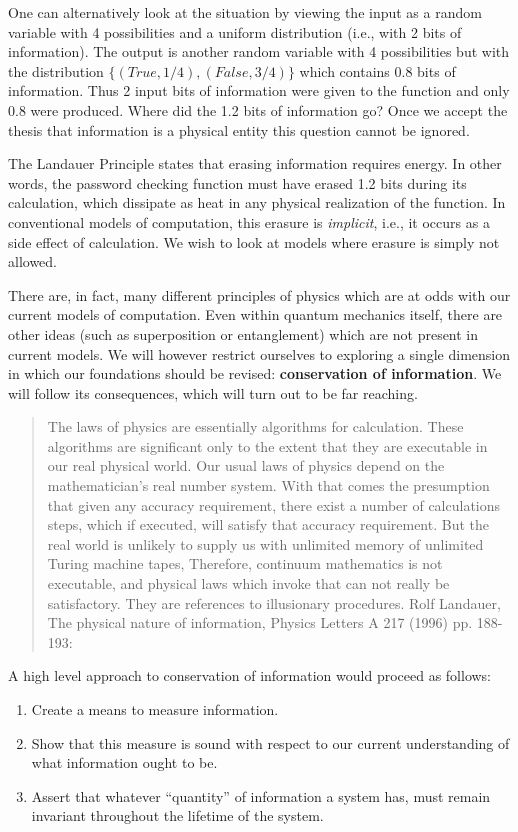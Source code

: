 \documentclass{article}
\begin{document}
One can alternatively look at the situation by viewing the input as a
random variable with 4 possibilities and a uniform distribution (i.e.,
with 2 bits of information). The output is another random variable
with 4 possibilities but with the distribution
$\{ (True, 1/4), (False, 3/4) \}$ which contains 0.8 bits of
information. Thus 2 input bits of information were given to the
function and only 0.8 were produced. Where did the 1.2 bits of
information go? Once we accept the thesis that information is a
physical entity this question cannot be ignored.

The Landauer Principle states that erasing information requires
energy. In other words, the password checking function must have
erased 1.2 bits during its calculation, which dissipate as heat in any
physical realization of the function. In conventional models of
computation, this erasure is \emph{implicit}, i.e., it occurs as a
side effect of calculation. We wish to look at models where
erasure is simply not allowed.

There are, in fact, many different principles of physics which are
at odds with our current models of computation. Even within quantum
mechanics itself, there are other ideas (such as superposition or
entanglement) which are not present in current models. We will however
restrict ourselves to exploring a single dimension in which our
foundations should be revised: \textbf{conservation of information}.
We will follow its consequences, which will turn out to be far reaching.

\begin{quote}
  The laws of physics are essentially algorithms for calculation. These
  algorithms are significant only to the extent that they are executable in
  our real physical world. Our usual laws of physics depend on the
  mathematician's real number system. With that comes the presumption that
  given any accuracy requirement, there exist a number of calculations steps,
  which if executed, will satisfy that accuracy requirement. But the real
  world is unlikely to supply us with unlimited memory of unlimited Turing
  machine tapes, Therefore, continuum mathematics is not executable, and
  physical laws which invoke that can not really be satisfactory. They are
  references to illusionary procedures. Rolf Landauer, The physical nature of
  information, Physics Letters A 217 (1996) pp. 188-193:
\end{quote}

A high level approach to conservation of information would proceed
as follows:
\begin{enumerate}
\item Create a means to measure information.
\item Show that this measure is sound with respect to our current understanding
of what information ought to be.
\item Assert that whatever ``quantity'' of information a system has, must
remain invariant throughout the lifetime of the system.
\end{enumerate}
\end{document}
